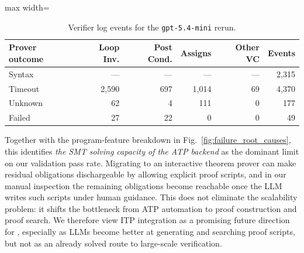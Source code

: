 \begin{table}[t]
\centering
\caption{Verifier log events for the \texttt{gpt-5.4-mini}  rerun.}
\label{tab:gpt54mini_failure_events}
\setlength{\tabcolsep}{3pt}
\begin{adjustbox}{max width=\linewidth}
\begin{tabular}{lrrrrr}
\toprule
\textbf{Prover outcome} & \textbf{Loop Inv.} & \textbf{Post Cond.} & \textbf{Assigns} & \textbf{Other VC} & \textbf{Events} \\
\midrule
Syntax & --- & --- & --- & --- & 2{,}315 \\
Timeout & 2{,}590 & 697 & 1{,}014 & 69 & 4{,}370 \\
Unknown & 62 & 4 & 111 & 0 & 177 \\
Failed & 27 & 22 & 0 & 0 & 49 \\
\bottomrule
\end{tabular}
\end{adjustbox}
\end{table}

Together with the program-feature breakdown in
Fig.~\ref{fig:failure_root_causes}, this identifies \emph{the SMT solving capacity of
the ATP backend} as the dominant limit on our validation pass rate. Migrating to an interactive theorem prover can make residual obligations dischargeable by allowing explicit proof scripts, and in our manual inspection the remaining obligations become reachable once the LLM writes such scripts under human guidance. This does not eliminate the scalability problem: it shifts the bottleneck from ATP automation to proof construction and proof search. We therefore view ITP integration as a promising future direction for \toolname, especially as LLMs become better at generating and searching proof scripts, but not as an already solved route to large-scale verification.
